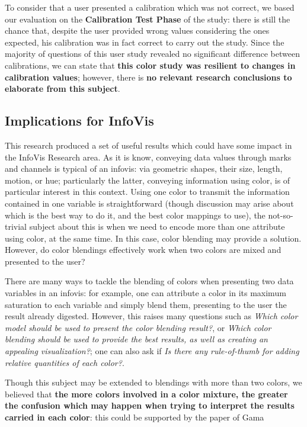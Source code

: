 %
To consider that a user presented a calibration which was not correct, we based our evaluation on the \textbf{Calibration Test Phase} of the
study: there is still the chance that, despite the user provided wrong values considering the ones expected, his calibration was in fact
correct to carry out the study. Since the majority of questions of this user study revealed no significant difference between calibrations,
we can state that \textbf{this color study was resilient to changes in calibration values}; however, there is \textbf{no relevant research
conclusions to elaborate from this subject}.
%
\subsection{Implications for InfoVis}
\label{subsec:results_discussion_infovis}
%
This research produced a set of useful results which could have some impact in the InfoVis Research area. As it is know,
conveying data values through marks and channels is typical of an infovis: via geometric shapes, their size, length, motion, or hue;
particularly the latter, conveying information using color, is of particular interest in this context. Using one color to transmit the information
contained in one variable is straightforward (though discussion may arise about which is the best way to do it, and the best color mappings to use),
the not-so-trivial subject about
this is when we need to encode more than one attribute using color, at the same time. In this case, color blending may provide a solution. However,
do color blendings effectively work when two colors are mixed and presented to the user? \par
%
There are many ways to tackle the blending of colors when presenting two data variables in an infovis: for example, one can attribute a color
in its maximum saturation to each variable and simply blend them, presenting to the user the result already digested. However, this raises
many questions such as \emph{Which color model should be used to present the color blending result?}, or \emph{Which color blending should be
used to provide the best results, as well as creating an appealing visualization?}; one can also ask if \emph{Is there any rule-of-thumb for
adding relative quantities of each color?}. \par
%
Though this subject may be extended to blendings with more than two colors, we believed that \textbf{the more colors involved in a color mixture,
the greater the confusion which may happen when trying to interpret the results carried in each color}: this could be supported by the paper of Gama
